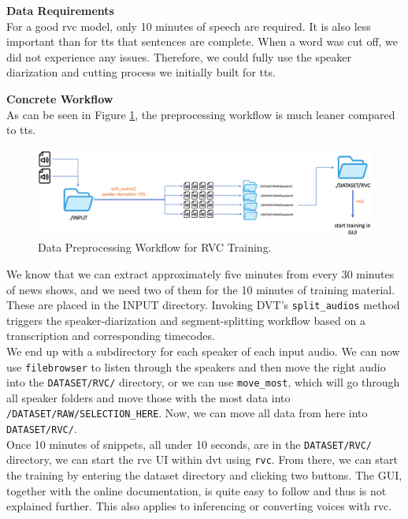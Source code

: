 \documentclass[
  a4paper,  %
  twoside,  %
  bibliography=totoc,
  headsepline,
  cleardoublepage=empty,
  parskip=half,
  draft=false
]{scrbook}
\begin{document}
\textbf{Data Requirements} \\
For a good \gls{rvc} model, only 10 minutes of speech are required. It is also less important than for \gls{tts} that sentences are complete. When a word was cut off, we did not experience any issues. Therefore, we could fully use the speaker diarization and cutting process we initially built for \gls{tts}. 

\textbf{Concrete Workflow} \\
As can be seen in Figure \ref{fig:rvc-wf}, the preprocessing workflow is much leaner compared to \gls{tts}.
\begin{figure}[h]

  \centering
  \includegraphics[width=1\textwidth]{./graphics/rvc/rvc-workflow.png}
  \caption{Data Preprocessing Workflow for RVC Training.}
  \label{fig:rvc-wf}
\end{figure}

We know that we can extract approximately five minutes from every 30 minutes of news shows, and we need two of them for the 10 minutes of training material. These are placed in the INPUT directory. Invoking DVT's \verb|split_audios| method triggers the speaker-diarization and segment-splitting workflow based on a transcription and corresponding timecodes. \\
We end up with a subdirectory for each speaker of each input audio. We can now use \verb|filebrowser| to listen through the speakers and then move the right audio into the \verb|DATASET/RVC/| directory, or we can use \verb|move_most|, which will go through all speaker folders and move those with the most data into \verb|/DATASET/RAW/SELECTION_HERE|. Now, we can move all data from here into \verb|DATASET/RVC/|. \\
Once 10 minutes of snippets, all under 10 seconds, are in the \verb|DATASET/RVC/| directory, we can start the \gls{rvc} UI within \gls{dvt} using \verb|rvc|. From there, we can start the training by entering the dataset directory and clicking two buttons. The GUI, together with the online documentation, is quite easy to follow and thus is not explained further. This also applies to inferencing or converting voices with \gls{rvc}.
\end{document}
